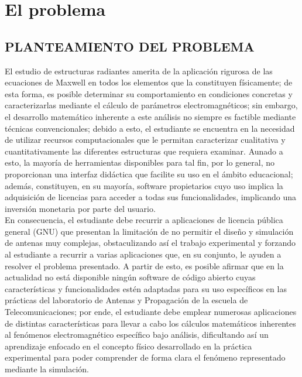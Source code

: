 
\chapter{El problema} %

\label{Capitulo1} %


\section{PLANTEAMIENTO DEL PROBLEMA}

El estudio de estructuras radiantes amerita de la aplicación rigurosa de las ecuaciones de Maxwell en todos los elementos que la constituyen físicamente; de esta forma, es posible determinar su comportamiento en condiciones concretas y caracterizarlas mediante el cálculo de parámetros electromagnéticos; sin embargo, el desarrollo matemático inherente a este análisis no siempre es factible mediante técnicas convencionales; debido a esto, el estudiante se encuentra en la necesidad de utilizar recursos computacionales que le permitan caracterizar cualitativa y cuantitativamente las diferentes estructuras que requiera examinar. Aunado a esto, la mayoría de herramientas disponibles para tal fin, por lo general, no proporcionan una interfaz didáctica que facilite su uso en el ámbito educacional; además, constituyen, en su mayoría, software propietarios cuyo uso implica la adquisición de licencias para  acceder a todas sus funcionalidades, implicando una inversión monetaria por parte del usuario.\\

En consecuencia, el estudiante debe recurrir a aplicaciones de licencia pública general (GNU) que presentan la limitación de no permitir el diseño y simulación de antenas muy complejas, obstaculizando así el trabajo experimental y forzando al estudiante a recurrir a varias aplicaciones que, en su conjunto, le ayuden a resolver el problema presentado. A partir de esto, es posible afirmar que en la actualidad no está disponible ningún software de código abierto cuyas características y funcionalidades estén adaptadas para su uso específicos en las prácticas del laboratorio de Antenas y Propagación de la escuela de Telecomunicaciones; por ende, el estudiante debe emplear numerosas aplicaciones de distintas características para llevar a cabo los cálculos matemáticos inherentes al fenómenos electromagnético específico bajo análisis, dificultando así un aprendizaje enfocado en el concepto físico desarrollado en la práctica experimental para poder comprender de forma clara el fenómeno representado mediante la simulación. 

